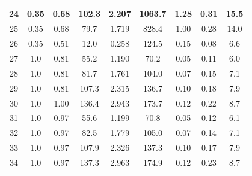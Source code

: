 \begin{table}[!h]
\begin{center}
\begin{tabular}{|c|c|c|c|c|c|c||c|c|}
24       & 0.35     & 0.68       & 102.3       &  2.207                &  1063.7        & 1.28          & 0.31      & 15.5          \\ \hline
25       & 0.35     & 0.68       & 79.7        &  1.719                &  828.4         & 1.00          & 0.28      & 14.0          \\ \hline
26       & 0.35     & 0.51       & 12.0        &  0.258                &  124.5         & 0.15          & 0.08      & 6.6          \\ \hline
27       & 1.0      & 0.81       & 55.2        &  1.190                &  70.2          & 0.05          & 0.11      & 6.0          \\ \hline
28       & 1.0      & 0.81       & 81.7        &  1.761                &  104.0         & 0.07          & 0.15      & 7.1          \\ \hline
29       & 1.0      & 0.81       & 107.3       &  2.315                &  136.7         & 0.10          & 0.18      & 7.9          \\ \hline
30       & 1.0      & 1.00       & 136.4       &  2.943                &  173.7         & 0.12          & 0.22      & 8.7          \\ \hline
31       & 1.0      & 0.97       & 55.6        &  1.199                &  70.8          & 0.05          & 0.12      & 6.1          \\ \hline
32       & 1.0      & 0.97       & 82.5        &  1.779                &  105.0         & 0.07          & 0.14      & 7.1          \\ \hline
33       & 1.0      & 0.97       & 107.9       &  2.326                &  137.3         & 0.10          & 0.17      & 7.9          \\ \hline
34       & 1.0      & 0.97       & 137.3       &  2.963                &  174.9         & 0.12          & 0.23      & 8.7          \\ \hline
\end{tabular}
\end{center}
\label{Hamins_Propane_Table}
\end{table}

\newpage


